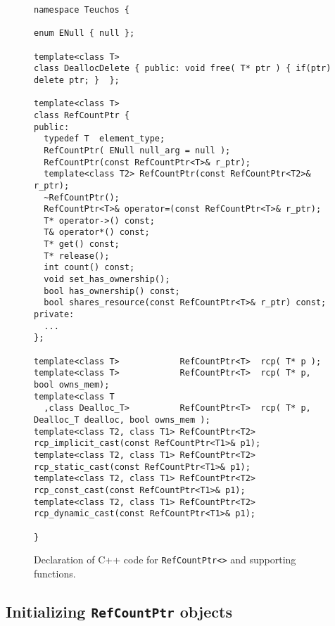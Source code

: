 \begin{figure}
{\scriptsize\begin{verbatim}
namespace Teuchos {

enum ENull { null };

template<class T>
class DeallocDelete { public: void free( T* ptr ) { if(ptr) delete ptr; }  };

template<class T>
class RefCountPtr {
public:
  typedef T  element_type;
  RefCountPtr( ENull null_arg = null );
  RefCountPtr(const RefCountPtr<T>& r_ptr);
  template<class T2> RefCountPtr(const RefCountPtr<T2>& r_ptr);
  ~RefCountPtr();
  RefCountPtr<T>& operator=(const RefCountPtr<T>& r_ptr);
  T* operator->() const;
  T& operator*() const;
  T* get() const;
  T* release();
  int count() const;
  void set_has_ownership();
  bool has_ownership() const;
  bool shares_resource(const RefCountPtr<T>& r_ptr) const;
private:
  ...
};

template<class T>            RefCountPtr<T>  rcp( T* p );
template<class T>            RefCountPtr<T>  rcp( T* p, bool owns_mem);
template<class T
  ,class Dealloc_T>          RefCountPtr<T>  rcp( T* p, Dealloc_T dealloc, bool owns_mem );
template<class T2, class T1> RefCountPtr<T2> rcp_implicit_cast(const RefCountPtr<T1>& p1);
template<class T2, class T1> RefCountPtr<T2> rcp_static_cast(const RefCountPtr<T1>& p1);
template<class T2, class T1> RefCountPtr<T2> rcp_const_cast(const RefCountPtr<T1>& p1);
template<class T2, class T1> RefCountPtr<T2> rcp_dynamic_cast(const RefCountPtr<T1>& p1);

}
\end{verbatim}}
\caption{\label{rcp:fig:decl}
Declaration of C++ code for \texttt{RefCountPtr<>} and supporting functions.}
\end{figure}

%
\subsection{Initializing \texttt{RefCountPtr} objects}
%

